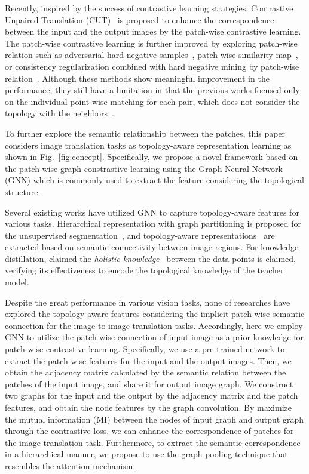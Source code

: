 \documentclass[letterpaper]{article} %
\begin{document}
Recently, inspired by the success of contrastive learning strategies, Contrastive Unpaired Translation (CUT)~\cite{cut} is proposed to enhance the correspondence between the input and the output images by the patch-wise contrastive learning.
The patch-wise contrastive learning is further improved by exploring patch-wise relation such as adversarial hard negative samples~\cite{negcut}, patch-wise similarity map~\cite{sesim}, or consistency regularization combined with hard negative mining by patch-wise relation~\cite{HnegSRC}. Although these methods show meaningful improvement in the performance, they still have a limitation in that the previous works focused only on the individual point-wise matching for each pair, which does not consider the topology with the neighbors~\cite{hkd}.




To further explore the semantic relationship between the patches, this paper considers   image translation tasks as topology-aware representation learning as shown in Fig.~\ref{fig:concept}.  Specifically, we propose a novel framework based on the patch-wise graph constrastive learning using the Graph Neural Network (GNN) which is commonly used to extract the feature considering the topological structure.

Several existing works have utilized GNN to capture topology-aware features for various tasks. Hierarchical representation with graph partitioning is proposed for the unsupervised segmentation~\cite{deepSpectral,tokenCut}, and topology-aware representations~\cite{visionGNN} are extracted based on semantic connectivity between image regions. For knowledge distillation, claimed the {\em holistic knowledge}~\cite{hkd} between the data points is claimed, verifying its effectiveness to encode the topological knowledge of the teacher model.

Despite the great performance in various vision tasks,
none of researches have explored the topology-aware features considering the implicit patch-wise semantic connection for the image-to-image translation tasks.
Accordingly, here we employ GNN to utilize the patch-wise connection of input image as a prior knowledge for patch-wise contrastive learning.
Specifically, we  use a pre-trained network to extract the patch-wise features for the input and the output images. Then, we obtain the adjacency matrix calculated by the semantic relation between the patches of the input image, and share it for output image graph. We construct two graphs for the input and the output by the adjacency matrix and the patch features, and obtain the node features by the graph convolution. By maximize the mutual information (MI) between the nodes of input graph and output graph through the contrastive loss, we can enhance the correspondence of patches for the image translation task.
Furthermore, to extract the semantic correspondence in a hierarchical manner,
we propose to use the graph pooling technique that resembles the attention mechanism. %
\end{document}
